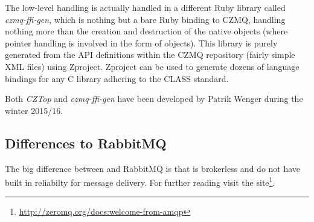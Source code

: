 The low-level handling is actually handled in a different Ruby library called
\emph{czmq-ffi-gen}, which is nothing but a bare Ruby binding to CZMQ, handling
nothing more than the creation and destruction of the native objects (where
pointer handling is involved in the form of  objects). This
library is purely generated from the API definitions within the CZMQ repository
(fairly simple XML files) using Zproject. Zproject can be used to generate
dozens of language bindings for any C library adhering to the \gls{CLASS}
standard.

Both \emph{CZTop} and \emph{czmq-ffi-gen} have been developed by Patrik Wenger
during the winter 2015/16.

\subsection{Differences to RabbitMQ}
The big difference between \zmq and RabbitMQ is that \zmq is brokerless and do not 
have built in reliabilty for message delivery. For further reading 
visit the \zmq site\footnote{\url{http://zeromq.org/docs:welcome-from-amqp}}.
